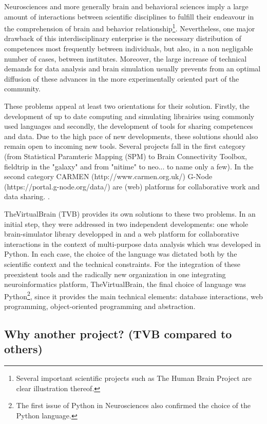 Neurosciences and more generally brain and behavioral sciences imply a large
amount of interactions between scientific disciplines to fulfill their endeavour
in the comprehension of brain and behavior relationship\footnote{Several
    important scientific projects such as The Human Brain Project are clear
illustration thereof.}. Nevertheless, one major drawback of this
interdisciplinary enterprise is the necessary distribution of competences most
frequently between individuals, but also, in a non negligable number of cases,
between institutes.  Moreover, the large increase of technical demands for data
analysis and brain simulation usually prevents from an optimal diffusion of these
advances in the more experimentally oriented part of the community. 

These problems appeal at least two orientations for their solution. Firstly,  the
development of up to date computing and simulating librairies using commonly
used languages and secondly, the development of tools for sharing
competences and data. Due to the high pace of new developments, these solutions
should also remain open to incoming new tools. Several projects fall in the
first category (from Statistical Paramteric Mapping (SPM) to Brain Connectivity Toolbox, fieldtrip in the \matlab{} "galaxy"
and from "nitime" to neo... to name only a few). In the second category CARMEN
(http://www.carmen.org.uk/) G-Node (https://portal.g-node.org/data/)
 are (web) platforms for collaborative work and data
sharing. .

TheVirtualBrain (TVB) provides its own solutions to these two problems.  In an
initial step, they were addressed in two independent developments: one whole
brain-simulator library developped in \matlab{} and a web platform for
collaborative interactions in the context of multi-purpose data analysis which
was developed in Python.  In each case, the choice of the language was dictated
both by the scientific context and the technical constraints. For the
integration of these preexistent tools and the radically new organization in
one integrating neuroinformatics platform, TheVirtualBrain, the final choice of
language was Python\footnote{The first issue of Python in Neurosciences also
confirmed the choice of the Python language.}, since it provides the main
technical elements: database interactions, web programming, object-oriented
programming and abstraction.

\subsection{Why another project? (TVB compared to others)}

